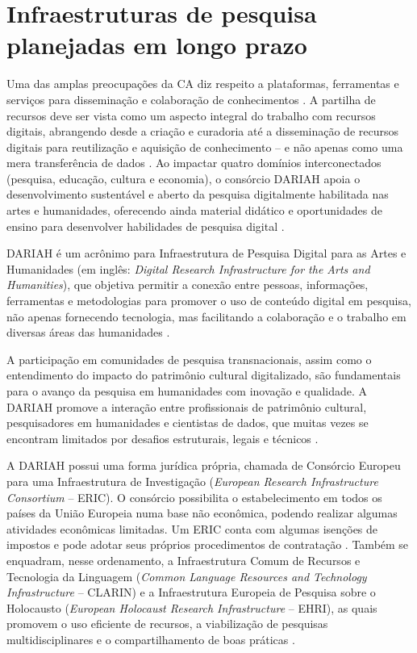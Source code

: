 \documentclass[portuguese]{textolivre}
\begin{document}
\section{Infraestruturas de pesquisa planejadas em longo prazo}\label{sec-conduta}
Uma das amplas preocupações da CA diz respeito a plataformas, ferramentas e serviços para disseminação e colaboração de conhecimentos \cite{fecher2013}. A partilha de recursos deve ser vista como um aspecto integral do trabalho com recursos digitais, abrangendo desde a criação e curadoria até a disseminação de recursos digitais para reutilização e aquisição de conhecimento – e não apenas como uma mera transferência de dados \cite{kalman2019}. Ao impactar quatro domínios interconectados (pesquisa, educação, cultura e economia), o consórcio DARIAH apoia o desenvolvimento sustentável e aberto da pesquisa digitalmente habilitada nas artes e humanidades, oferecendo ainda material didático e oportunidades de ensino para desenvolver habilidades de pesquisa digital \cite{dariah2024}.

DARIAH é um acrônimo para Infraestrutura de Pesquisa Digital para as Artes e Humanidades (em inglês: \textit{Digital Research Infrastructure for the Arts and Humanities}), que objetiva permitir a conexão entre pessoas, informações, ferramentas e metodologias para promover o uso de conteúdo digital em pesquisa, não apenas fornecendo tecnologia, mas facilitando a colaboração e o trabalho em diversas áreas das humanidades \cite{henrich2013}.

A participação em comunidades de pesquisa transnacionais, assim como o entendimento do impacto do patrimônio cultural digitalizado, são fundamentais para o avanço da pesquisa em humanidades com inovação e qualidade. A DARIAH promove a interação entre profissionais de patrimônio cultural, pesquisadores em humanidades e cientistas de dados, que muitas vezes se encontram limitados por desafios estruturais, legais e técnicos \cite{tasovac2020}.

A DARIAH possui uma forma jurídica própria, chamada de Consórcio Europeu para uma Infraestrutura de Investigação (\textit{European Research Infrastructure Consortium} – ERIC). O consórcio possibilita o estabelecimento em todos os países da União Europeia numa base não econômica, podendo realizar algumas atividades econômicas limitadas. Um ERIC conta com algumas isenções de impostos e pode adotar seus próprios procedimentos de contratação \cite{comissaoeuropeia2023eric}. Também se enquadram, nesse ordenamento, a Infraestrutura Comum de Recursos e Tecnologia da Linguagem (\textit{Common Language Resources and Technology Infrastructure} – CLARIN) e a Infraestrutura Europeia de Pesquisa sobre o Holocausto (\textit{European Holocaust Research Infrastructure} – EHRI), as quais promovem o uso eficiente de recursos, a viabilização de pesquisas multidisciplinares e o compartilhamento de boas práticas \cite{anuradha2024,bassett2019}.
\end{document}
